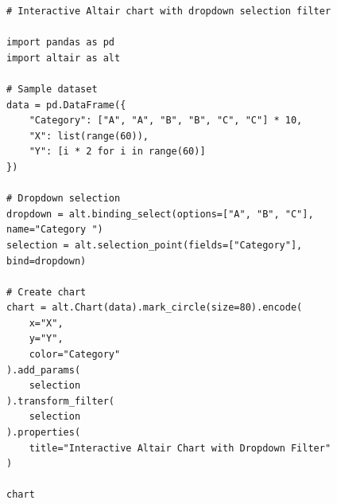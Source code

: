 \begin{verbatim}
# Interactive Altair chart with dropdown selection filter

import pandas as pd
import altair as alt

# Sample dataset
data = pd.DataFrame({
    "Category": ["A", "A", "B", "B", "C", "C"] * 10,
    "X": list(range(60)),
    "Y": [i * 2 for i in range(60)]
})

# Dropdown selection
dropdown = alt.binding_select(options=["A", "B", "C"], 
name="Category ")
selection = alt.selection_point(fields=["Category"], 
bind=dropdown)

# Create chart
chart = alt.Chart(data).mark_circle(size=80).encode(
    x="X",
    y="Y",
    color="Category"
).add_params(
    selection
).transform_filter(
    selection
).properties(
    title="Interactive Altair Chart with Dropdown Filter"
)

chart
\end{verbatim}